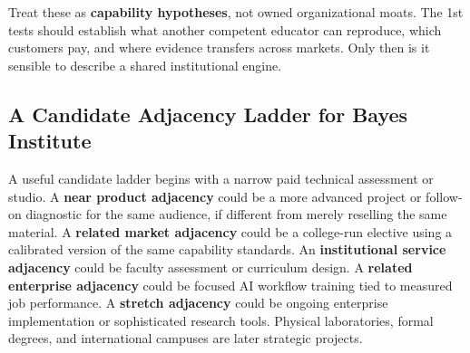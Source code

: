 Treat these as \textbf{capability hypotheses}, not owned organizational moats. The 1st tests should establish what another competent educator can reproduce, which customers pay, and where evidence transfers across markets. Only then is it sensible to describe a shared institutional engine.

\subsection{A Candidate Adjacency Ladder for Bayes Institute}
\label{sec:candidate_adjacency_ladder_bayes}

A useful candidate ladder begins with a narrow paid technical assessment or studio. A \textbf{near product adjacency} could be a more advanced project or follow-on diagnostic for the same audience, if different from merely reselling the same material. A \textbf{related market adjacency} could be a college-run elective using a calibrated version of the same capability standards. An \textbf{institutional service adjacency} could be faculty assessment or curriculum design. A \textbf{related enterprise adjacency} could be focused AI workflow training tied to measured job performance. A \textbf{stretch adjacency} could be ongoing enterprise implementation or sophisticated research tools. Physical laboratories, formal degrees, and international campuses are later strategic projects.

